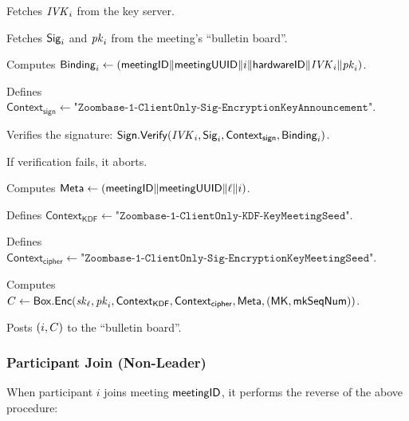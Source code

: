\begingroup
\RaggedRight
\begin{enumerate*}
\item Fetches $\mathit{IVK}_i$ from the key server.
\item Fetches ${\sf Sig}_i$ and $\mathit{pk}_i$ from the meeting's ``bulletin board''.
\item Computes ${\sf Binding}_i \leftarrow \left( {\sf meetingID} \| \allowbreak {\sf meetingUUID} \| i \allowbreak \| {\sf hardwareID} \| \mathit{IVK}_i \| \allowbreak \mathit{pk}_i \right)$.
\item Defines $\textsf{Context}_\textsf{sign} \leftarrow \texttt{"Zoombase-1-ClientOnly-Sig-EncryptionKeyAnnouncement"}$.
\item Verifies the signature: ${\sf Sign}.\mathsf{Verify}(\mathit{IVK}_i, {\sf Sig}_i, \textsf{Context}_\textsf{sign}, {\sf Binding}_i)$.
\item If verification fails, it aborts.
\item Computes ${\sf Meta} \leftarrow \left( {\sf meetingID} \| \allowbreak {\sf meetingUUID} \| \allowbreak \ell \| i \right)$.
\item Defines $\textsf{Context}_\textsf{KDF} \leftarrow \texttt{"Zoombase-1-ClientOnly-KDF-KeyMeetingSeed"}$.
\item Defines $\textsf{Context}_\textsf{cipher} \leftarrow \texttt{"Zoombase-1-ClientOnly-Sig-EncryptionKeyMeetingSeed"}$.
\item Computes $C \leftarrow {\sf Box}.\mathsf{Enc}(\mathit{sk}_\ell, \mathit{pk}_i, \textsf{Context}_\textsf{KDF},
    \textsf{Context}_\textsf{cipher}, {\sf Meta}, ({\sf MK}, \mathsf{mkSeqNum}))$.
   \label{participantJoinRekeyStart}
\item Posts $(i, C)$ to the ``bulletin board''.
   \label{participantJoinRekeyEnd}
\end{enumerate*}
\endgroup

\subsubsection{Participant Join (Non-Leader)}

When participant $i$ joins meeting ${\sf meetingID}$, it performs the reverse of the above procedure:

